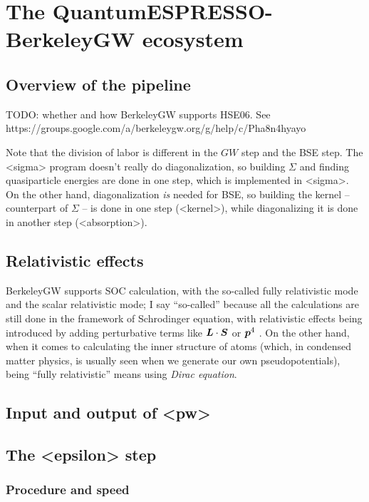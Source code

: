 \documentclass[hyperref, a4paper, 12pt]{report}
\def\texttt#1{<#1>}%
\newcommand{\shortcode}[1]{\texttt{#1}}
\begin{document}
\chapter{The QuantumESPRESSO-BerkeleyGW ecosystem}

\section{Overview of the pipeline}

TODO: whether and how BerkeleyGW supports HSE06.
See https://groups.google.com/a/berkeleygw.org/g/help/c/Pha8n4hyayo

Note that the division of labor is different in the $GW$ step and the BSE step.
The \shortcode{sigma} program doesn't really do diagonalization,
so building $\Sigma$ and finding quasiparticle energies 
are done in one step, which is implemented in \shortcode{sigma}.
On the other hand, 
diagonalization \emph{is} needed for BSE,
so building the kernel -- counterpart of $\Sigma$ -- 
is done in one step (\shortcode{kernel}),
while diagonalizing it is done in another step (\shortcode{absorption}).

\section{Relativistic effects}

BerkeleyGW supports SOC calculation, 
with the so-called fully relativistic mode 
and the scalar relativistic mode;
I say ``so-called'' because all the calculations are still done 
in the framework of Schrodinger equation,
with relativistic effects being introduced by 
adding perturbative terms like $\vb*{L} \cdot \vb*{S}$ or $\vb*{p}^4$ \cite{barker2022spinor}.
On the other hand, when it comes to calculating the inner structure of atoms 
(which, in condensed matter physics,
is usually seen when we generate our own pseudopotentials),
being ``fully relativistic'' means using \emph{Dirac equation}.

\section{Input and output of \shortcode{pw}}

\section{The \shortcode{epsilon} step}

\subsection{Procedure and speed}\label{sec:epsilon.procedure-speed}
\end{document}
